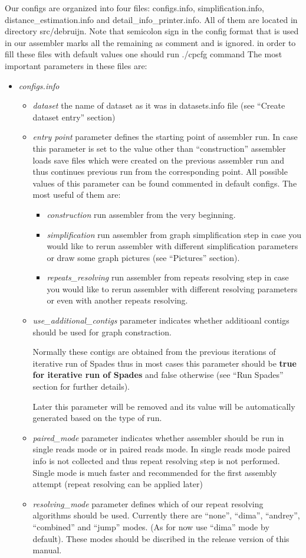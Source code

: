 \documentclass[a4paper,10pt]{article}
\begin{document}
Our configs are organized into four files: configs.info, simplification.info, distance\_estimation.info and detail\_info\_printer.info. All of them are located in directory src/debruijn.
Note that semicolon sign in the config format that is used in our assembler marks all the remaining as comment and is ignored.
in order to fill these files with default values one should run ./cpcfg command  
The most important parameters in these files are:

\begin{itemize}
\item {\it configs.info}

\begin{itemize}
\item {\it dataset} the name of dataset as it was in datasets.info file (see ``Create dataset entry'' section)
\item {\it entry point} parameter defines the starting point of assembler run.
In case this parameter is set to the value other than ``construction'' assembler loads save files which were created on the previous assembler run and thus continues previous run from the corresponding point.
All possible values of this parameter can be found commented in default configs.
The most useful of them are:
\begin{itemize}
\item {\it construction} run assembler from the very beginning.
\item {\it simplification} run assembler from graph simplification step in case you would like to rerun assembler with different simplification parameters or draw some graph pictures (see ``Pictures'' section).
\item {\it repeats\_resolving} run assembler from repeats resolving step in case you would like to rerun assembler with different resolving parameters or even with another repeats resolving.
\end{itemize}
\item {\it use\_additional\_contigs} parameter indicates whether additioanl contigs should be used for graph constraction.

Normally these contigs are obtained from the previous iterations of iterative run of Spades thus 
in most cases this parameter should be \textbf{true for iterative run of Spades} 
and false otherwise (see ``Run Spades'' section for further details).

Later this parameter will be removed and its value will be automatically generated based on the type of run.
\item {\it paired\_mode} parameter indicates whether assembler should be run in single reads mode or in paired reads mode. 
In single reads mode paired info is not collected and thus repeat resolving step is not performed. Single mode is much faster and recommended
for the first assembly attempt (repeat resolving can be applied later)
\item {\it resolving\_mode} parameter defines which of our repeat resolving algorithms should be used.
Currently there are ``none'', ``dima'', ``andrey'', ``combined'' and ``jump'' modes. (As for now use ``dima'' mode by default).
These modes should be discribed in the release version of this manual. 


\end{itemize}
\end{itemize}
\end{document}
